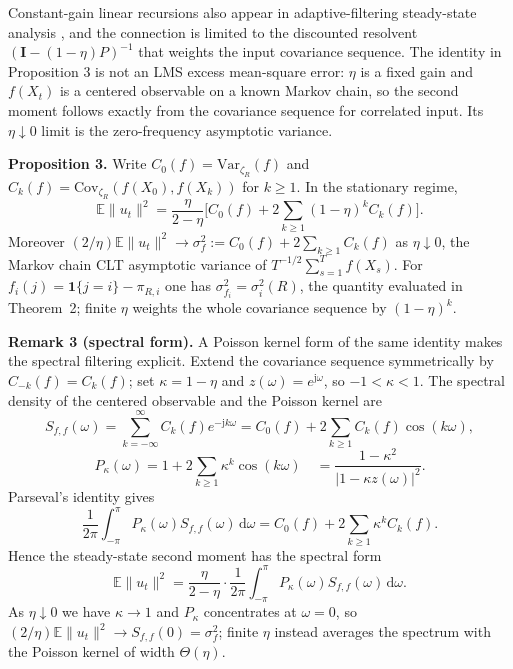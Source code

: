 \documentclass[twoside,11pt]{article}
\begin{document}
Constant-gain linear recursions also appear in adaptive-filtering steady-state analysis \citep{ref22,ref23}, and the connection is limited to the discounted resolvent $(\mathbf{I}-(1-\eta)P)^{-1}$ that weights the input covariance sequence. The identity in Proposition 3 is not an LMS excess mean-square error: $\eta$ is a fixed gain and $f(X_t)$ is a centered observable on a known Markov chain, so the second moment follows exactly from the covariance sequence for correlated input. Its $\eta\downarrow0$ limit is the zero-frequency asymptotic variance.

\textbf{Proposition 3.} Write $C_0(f)=\mathrm{Var}_{\zeta_R}(f)$ and $C_k(f)=\mathrm{Cov}_{\zeta_R}(f(X_0),f(X_k))$ for $k\geq1$. In the stationary regime,
\begin{equation}\label{eq:e13}
\mathbb{E}\|u_t\|^{2} =\dfrac{\eta}{2-\eta}\Big[C_0(f)+2\sum_{k\geq1}(1-\eta)^{k}C_k(f)\Big].
\end{equation}
Moreover $(2/\eta)\mathbb{E}\|u_t\|^{2}\to\sigma_f^{2}:=C_0(f)+2\sum_{k\geq1}C_k(f)$ as $\eta\downarrow0$, the Markov chain CLT asymptotic variance of $T^{-1/2}\sum_{s=1}^{T}f(X_s)$. For $f_i(j)=\mathbf{1}\{j=i\}-\pi_{R,i}$ one has $\sigma_{f_i}^{2}=\sigma_i^{2}(R)$, the quantity evaluated in Theorem~2; finite $\eta$ weights the whole covariance sequence by $\left(1-\eta\right)^{k}$.

\textbf{Remark 3 (spectral form).} A Poisson kernel form of the same identity makes the spectral filtering explicit. Extend the covariance sequence symmetrically by $C_{-k}(f)=C_k(f)$; set $\kappa=1-\eta$ and $z(\omega)=e^{\mathrm{j}\omega}$, so $-1<\kappa<1$. The spectral density of the centered observable and the Poisson kernel are
\begin{equation}\label{eq:e14}
S_{f,f}(\omega)=\sum_{k=-\infty}^{\infty}C_k(f) e^{-\mathrm{j}k\omega}=C_0(f)+2\sum_{k\geq1}C_k(f)\cos(k\omega),
\end{equation}
\begin{equation}\label{eq:e15}
P_{\kappa}(\omega) =1+2\sum_{k\geq1}\kappa^{k}\cos(k\omega)\quad =\dfrac{1-\kappa^{2}}{\left|1-\kappa z(\omega)\right|^{2}}.
\end{equation}
Parseval's identity gives
\begin{equation}\label{eq:e16}
\frac{1}{2\pi}\int_{-\pi}^{\pi}P_{\kappa}(\omega)S_{f,f}(\omega)\,\mathrm{d}\omega =C_0(f)+2\sum_{k\geq1}\kappa^{k}C_k(f).
\end{equation}
Hence the steady-state second moment has the spectral form
\begin{equation}\label{eq:e17}
\mathbb{E}\|u_t\|^{2} =\dfrac{\eta}{2-\eta}\cdot\dfrac{1}{2\pi}\int_{-\pi}^{\pi}P_{\kappa}(\omega)S_{f,f}(\omega)\,\mathrm{d}\omega.
\end{equation}
As $\eta\downarrow0$ we have $\kappa\to1$ and $P_{\kappa}$ concentrates at $\omega=0$, so $(2/\eta)\mathbb{E}\|u_t\|^{2}\to S_{f,f}(0)=\sigma_f^{2}$; finite $\eta$ instead averages the spectrum with the Poisson kernel of width $\Theta(\eta)$.
\end{document}
